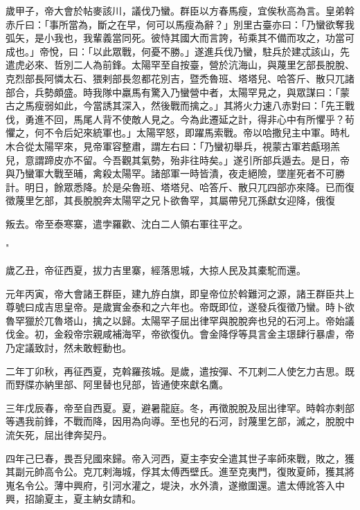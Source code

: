 \begin{pinyinscope}
 歲甲子，帝大會於帖麥該川，議伐乃蠻。群臣以方春馬瘦，宜俟秋高為言。皇弟斡赤斤曰：「事所當為，斷之在早，何可以馬瘦為辭？」別里古臺亦曰：「乃蠻欲奪我弧矢，是小我也，我輩義當同死。彼恃其國大而言誇，茍乘其不備而攻之，功當可成也。」帝悅，曰：「以此眾戰，何憂不勝。」遂進兵伐乃蠻，駐兵於建忒該山，先遣虎必來、哲別二人為前鋒。太陽罕至自按臺，營於沆海山，與蔑里乞部長脫脫、克烈部長阿憐太石、猥剌部長忽都花別吉，暨禿魯班、塔塔兒、哈答斤、散只兀諸部合，兵勢頗盛。時我隊中羸馬有驚入乃蠻營中者，太陽罕見之，與眾謀曰：「蒙古之馬瘦弱如此，今當誘其深入，然後戰而擒之。」其將火力速八赤對曰：「先王戰伐，勇進不回，馬尾人背不使敵人見之。今為此遷延之計，得非心中有所懼乎？茍懼之，何不令后妃來統軍也。」太陽罕怒，即躍馬索戰。帝以哈撒兒主中軍。時札木合從太陽罕來，見帝軍容整肅，謂左右曰：「乃蠻初舉兵，視蒙古軍若甗珝羔兒，意謂蹄皮亦不留。今吾觀其氣勢，殆非往時矣。」遂引所部兵遁去。是日，帝與乃蠻軍大戰至晡，禽殺太陽罕。諸部軍一時皆潰，夜走絕險，墜崖死者不可勝計。明日，餘眾悉降。於是朵魯班、塔塔兒、哈答斤、散只兀四部亦來降。已而復徵蔑里乞部，其長脫脫奔太陽罕之兄卜欲魯罕，其屬帶兒兀孫獻女迎降，俄復



 叛去。帝至泰寒寨，遣孛羅歡、沈白二人領右軍往平之。



 "



 歲乙丑，帝征西夏，拔力吉里寨，經落思城，大掠人民及其橐駝而還。



 元年丙寅，帝大會諸王群臣，建九斿白旗，即皇帝位於斡難河之源，諸王群臣共上尊號曰成吉思皇帝。是歲實金泰和之六年也。帝既即位，遂發兵復徵乃蠻。時卜欲魯罕獵於兀魯塔山，擒之以歸。太陽罕子屈出律罕與脫脫奔也兒的石河上。帝始議伐金。初，金殺帝宗親咸補海罕，帝欲復仇。會金降俘等具言金主璟肆行暴虐，帝乃定議致討，然未敢輕動也。



 二年丁卯秋，再征西夏，克斡羅孩城。是歲，遣按彈、不兀剌二人使乞力吉思。既而野牒亦納里部、阿里替也兒部，皆通使來獻名鷹。



 三年戊辰春，帝至自西夏。夏，避暑龍庭。冬，再徵脫脫及屈出律罕。時斡亦剌部等遇我前鋒，不戰而降，因用為向導。至也兒的石河，討蔑里乞部，滅之，脫脫中流矢死，屈出律奔契丹。



 四年己巳春，畏吾兒國來歸。帝入河西，夏主李安全遣其世子率師來戰，敗之，獲其副元帥高令公。克兀剌海城，俘其太傅西壁氏。進至克夷門，復敗夏師，獲其將嵬名令公。薄中興府，引河水灌之，堤決，水外潰，遂撤圍還。遣太傅訛答入中興，招諭夏主，夏主納女請和。




\end{pinyinscope}
